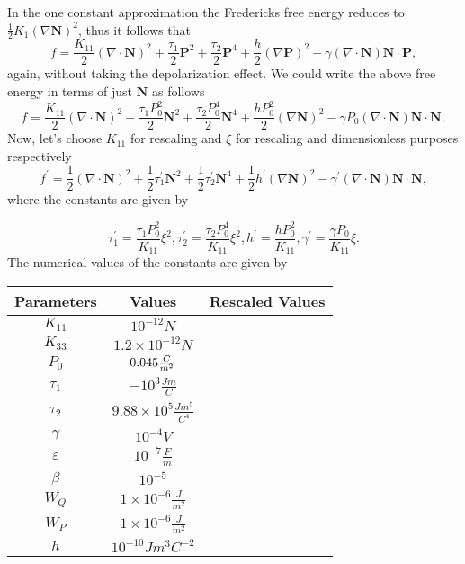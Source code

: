 \documentclass[oneside,english]{amsart}
\providecommand{\tabularnewline}{\\}
\numberwithin{equation}{section}
\numberwithin{figure}{section}
\begin{document}
In the one constant approximation the Fredericks free energy reduces
to $\frac{1}{2}K_{1}\left(\nabla\mathbf{N}\right)^{2}$, thus it follows
that 
\[
f=\frac{K_{11}}{2}\left(\nabla\cdot\mathbf{N}\right)^{2}+\frac{\tau_{1}}{2}\mathbf{P}^{2}+\frac{\tau_{2}}{2}\mathbf{P}^{4}+\frac{h}{2}\left(\nabla\mathbf{P}\right)^{2}-\gamma\left(\nabla\cdot\mathbf{N}\right)\mathbf{N}\cdot\mathbf{P},
\]
again, without taking the depolarization effect. We could write the
above free energy in terms of just $\mathbf{N}$ as follows 
\[
f=\frac{K_{11}}{2}\left(\nabla\cdot\mathbf{N}\right)^{2}+\frac{\tau_{1}P_{0}^{2}}{2}\mathbf{N}^{2}+\frac{\tau_{2}P_{0}^{4}}{2}\mathbf{N}^{4}+\frac{hP_{0}^{2}}{2}\left(\nabla\mathbf{N}\right)^{2}-\gamma P_{0}\left(\nabla\cdot\mathbf{N}\right)\mathbf{N}\cdot\mathbf{N},
\]
Now, let's choose $K_{11}$ for rescaling and $\xi$ for rescaling
and dimensionless purposes respectively 
\[
f^{\prime}=\frac{1}{2}\left(\nabla\cdot\mathbf{N}\right)^{2}+\frac{1}{2}\tau_{1}^{\prime}\mathbf{N}^{2}+\frac{1}{2}\tau_{2}^{\prime}\mathbf{N}^{4}+\frac{1}{2}h^{\prime}\left(\nabla\mathbf{N}\right)^{2}-\gamma^{\prime}\left(\nabla\cdot\mathbf{N}\right)\mathbf{N}\cdot\mathbf{N},
\]
where the constants are given by 

\[
\tau_{1}^{\prime}=\frac{\tau_{1}P_{0}^{2}}{K_{11}}\xi^{2},\tau_{2}^{\prime}=\frac{\tau_{2}P_{0}^{4}}{K_{11}}\xi^{2},h^{\prime}=\frac{hP_{0}^{2}}{K_{11}},\gamma^{\prime}=\frac{\gamma P_{0}}{K_{11}}\xi.
\]
The numerical values of the constants are given by

\begin{minipage}[t]{1\columnwidth}%
\begin{center}
\begin{tabular}{|c|c|c|}
\hline 
Parameters & Values & Rescaled Values\tabularnewline
\hline 
\hline 
$K_{11}$ & $10^{-12}N$ & \tabularnewline
\hline 
$K_{33}$ & $1.2\times10^{-12}N$ & \tabularnewline
\hline 
$P_{0}$ & $0.045\text{\ensuremath{\frac{C}{m^{2}}}}$ & \tabularnewline
\hline 
$\tau_{1}$ & $-10^{3}\frac{Jm}{C}$ & \tabularnewline
\hline 
$\tau_{2}$ & $9.88\times10^{5}\frac{Jm^{5}}{C^{4}}$ & \tabularnewline
\hline 
$\gamma$ & $10^{-4}V$ & \tabularnewline
\hline 
$\varepsilon$ & $10^{-7}\frac{F}{m}$ & \tabularnewline
\hline 
$\beta$ & $10^{-5}$ & \tabularnewline
\hline 
$W_{Q}$ & $1\times10^{-6}\frac{J}{m^{2}}$ & \tabularnewline
\hline 
$W_{P}$ & $1\times10^{-6}\frac{J}{m^{2}}$ & \tabularnewline
\hline 
$h$ & $10^{-10}Jm^{3}C^{-2}$ & \tabularnewline
\hline 
\end{tabular}
\par\end{center}%
\end{minipage}
\end{document}
